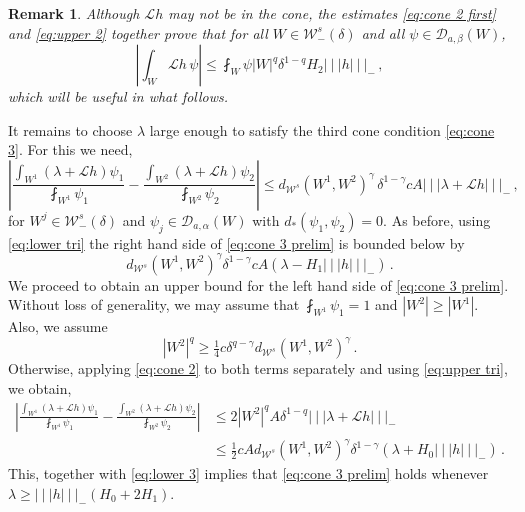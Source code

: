 \documentclass{amsart}
\numberwithin{equation}{section}
\newtheorem{rem}[thm]{Remark}
\newcommand\cD{{\mathcal D}}
\newcommand\cL{{\mathcal L}}
\newcommand\cW{{\mathcal W}}
\newcommand{\tri}{{|\:\!\!|\:\!\!|}}
\begin{document}
\begin{rem}
\label{rem:useful bound}
Although $\cL h$ may not be in the cone, the estimates \eqref{eq:cone 2 first} and \eqref{eq:upper 2}
together prove that for all $W \in \cW^s_-(\delta)$ and all $\psi \in \cD_{a, \beta}(W)$,
\[
\left| \int_W \cL h \, \psi \right| \le \fint_W \psi |W|^q \delta^{1-q} H_2 \tri h \tri_- \, ,
\]
which will be useful in what follows.
\end{rem}
It remains to choose $\lambda$ large enough to satisfy the third cone condition \eqref{eq:cone 3}.
For this we need,
\begin{equation}
\label{eq:cone 3 prelim}
\left|\frac{\int_{W^1} (\lambda + \cL h ) \psi_1}{\fint_{W^1}\psi_1}  - \frac{\int_{W^2} (\lambda+  \cL h) \psi_2}{\fint_{W^2}\psi_2} \right|
\leq
d_{\cW^s}(W^1, W^2)^\gamma \, \delta^{1-\gamma}   c A \tri \lambda + \cL h \tri_- \, ,
\end{equation}
for $W^j \in \cW^s_-(\delta)$ and $\psi_j \in \cD_{a, \alpha}(W)$ with $d_*(\psi_1, \psi_2) = 0$.
As before, using \eqref{eq:lower tri} 
the right hand side of \eqref{eq:cone 3 prelim} is bounded below by
\begin{equation}
\label{eq:lower 3}
d_{\cW^s}(W^1, W^2)^\gamma \delta^{1-\gamma} cA ( \lambda - H_1 \tri h \tri_- ) \, .
\end{equation}
We proceed to obtain an upper bound for the left hand side of \eqref{eq:cone 3 prelim}. 
Without loss of generality, we may assume that $\fint_{W^1} \psi_1 = 1$ and $|W^2| \ge |W^1|$.
Also, we assume
\begin{equation}
\label{eq:lower W2}
|W^2|^q \ge \tfrac 14 c \delta^{q-\gamma} d_{\cW^s}(W^1, W^2)^\gamma \, .
\end{equation}
Otherwise, applying \eqref{eq:cone 2} to both terms separately and using \eqref{eq:upper tri}, we obtain,
\[
\begin{split}
\left|\frac{\int_{W^1} (\lambda + \cL h ) \psi_1}{\fint_{W^1}\psi_1}  - \frac{\int_{W^2} (\lambda+  \cL h) \psi_2}{\fint_{W^2}\psi_2} \right|
& \leq 2 |W^2|^q A \delta^{1-q} \tri \lambda + \cL h \tri_- \\
& \leq \tfrac{1}{2} c A d_{\cW^s}(W^1, W^2)^\gamma \delta^{1-\gamma} ( \lambda + H_0 \tri h \tri_-) \, .
\end{split}
\]
This, together with \eqref{eq:lower 3} implies that \eqref{eq:cone 3 prelim} holds whenever 
$\lambda \ge \tri h \tri_- (H_0 + 2 H_1)$.
 
\end{document}
